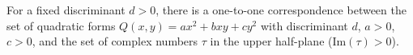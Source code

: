 For a fixed discriminant $d > 0$, there is a one-to-one correspondence between the set of quadratic forms $Q(x, y) = ax^2 + bxy + cy^2$ with discriminant $d$, $a > 0$, $c > 0$, and the set of complex numbers $\tau$ in the upper half-plane ($\text{Im}(\tau) > 0$).
